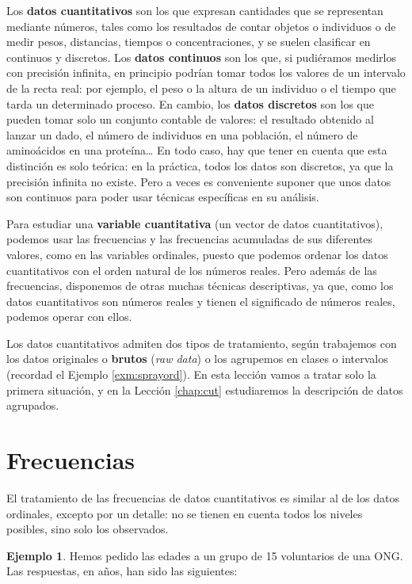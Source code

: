 \documentclass[
]{book}
\theoremstyle{definition}
\theoremstyle{definition}
\newtheorem{example}{Ejemplo}[chapter]
\theoremstyle{definition}
\theoremstyle{remark}
\begin{document}
Los \textbf{datos cuantitativos} son los que expresan cantidades que se representan mediante números, tales como los resultados de contar objetos o individuos o de medir pesos, distancias, tiempos o concentraciones, y se suelen clasificar en continuos y discretos.
Los \textbf{datos continuos} son los que, si pudiéramos medirlos con precisión infinita, en principio podrían tomar todos los valores de un intervalo de la recta real: por ejemplo, el peso o la altura de un individuo o el tiempo que tarda un determinado proceso.
En cambio, los \textbf{datos discretos} son los que pueden tomar solo un conjunto contable de valores: el resultado obtenido al lanzar un dado, el número de individuos en una población, el número de aminoácidos en una proteína\ldots{} En todo caso, hay que tener en cuenta que esta distinción es solo teórica: en la práctica, todos los datos son discretos, ya que la precisión infinita no existe. Pero a veces es conveniente suponer que unos datos son continuos para poder usar técnicas específicas en su análisis.

Para estudiar una \textbf{variable cuantitativa} (un vector de datos cuantitativos), podemos usar las frecuencias y las frecuencias acumuladas de sus diferentes valores,
como en las variables ordinales, puesto que podemos ordenar los datos cuantitativos con el orden natural de los números reales. Pero además de las frecuencias, disponemos de otras muchas técnicas descriptivas, ya que, como los datos cuantitativos son números reales y tienen el significado de números reales, podemos operar con ellos.

Los datos cuantitativos admiten dos tipos de tratamiento, según trabajemos con los datos originales o \textbf{brutos} (\emph{raw data}) o los agrupemos en clases o intervalos (recordad el Ejemplo \ref{exm:sprayord}). En esta lección vamos a tratar solo la primera situación, y en la Lección \ref{chap:cut} estudiaremos la descripción de datos agrupados.

\hypertarget{sec:quan}{%
\section{Frecuencias}\label{sec:quan}}

El tratamiento de las frecuencias de datos cuantitativos es similar al de los datos ordinales, excepto por un detalle: no se tienen en cuenta todos los niveles posibles, sino solo los observados.

\begin{example}
\protect\hypertarget{exm:ex181}{}{\label{exm:ex181} }Hemos pedido las edades a un grupo de 15 voluntarios de una ONG. Las respuestas, en años, han sido las siguientes:
\end{example}
\end{document}
